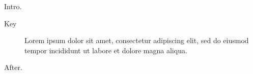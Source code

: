 \documentclass[12pt,twocolumn]{article}
\begin{document}
Intro.
\begin{description}
\item[Key] Lorem ipsum dolor sit amet, consectetur adipiscing elit, sed do eiusmod tempor incididunt ut labore et dolore magna aliqua.
\end{description}
After.
\end{document}
